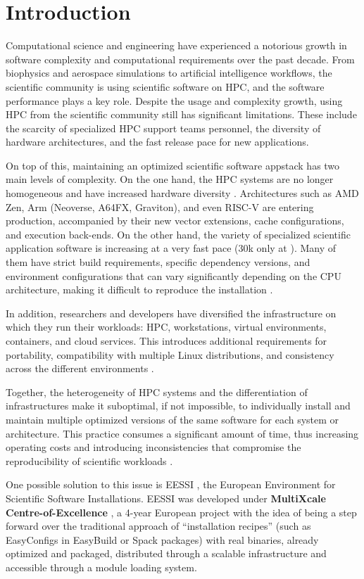 \documentclass[11pt,a4paper]{article}
\begin{document}
\section{Introduction}
Computational science and engineering have experienced a notorious growth in software complexity and computational requirements over the past decade. From biophysics and aerospace simulations to artificial intelligence workflows, the scientific community is using scientific software on HPC, and the software performance plays a key role.
Despite the usage and complexity growth, using HPC from the scientific community still has significant limitations. These include the scarcity of specialized HPC support teams personnel, the diversity of hardware architectures, and the fast release pace for new applications. 

On top of this, maintaining an optimized scientific software appstack has two  main levels of complexity. On the one hand, the HPC systems are no longer homogeneous and have increased hardware diversity \citep{Strohmaier}. Architectures such as AMD Zen, Arm (Neoverse, A64FX, Graviton), and even RISC-V are entering production, accompanied by their new vector extensions, cache configurations, and execution back-ends. 
On the other hand, the variety of specialized scientific application software is increasing at a very fast pace (30k only at \cite{Ison2019}). Many of them have strict build requirements, specific dependency versions, and environment configurations that can vary significantly depending on the CPU architecture, making it difficult to reproduce the installation \citep{Taschuk2017}.

In addition, researchers and developers have diversified the infrastructure on which they run their workloads: HPC, workstations, virtual environments, containers, and cloud services. This introduces additional requirements for portability, compatibility with multiple Linux distributions, and consistency across the different environments \citep{Droge2023,OCais2025,Bhattacharya2022}. 

Together, the heterogeneity of HPC systems and the differentiation of infrastructures make it suboptimal, if not impossible, to individually install and maintain multiple optimized versions of the same software for each system or architecture.  This practice consumes a significant amount of time, thus increasing operating costs and introducing inconsistencies that compromise the reproducibility of scientific workloads \citep{Taschuk2017}.

One possible solution to this issue is EESSI \citep{Droge2023}, the European Environment for Scientific Software Installations. EESSI was developed under \textbf{MultiXcale Centre-of-Excellence} \citep{mxs}, a 4-year European project with the idea of being a step forward over the traditional approach of “installation recipes” (such as EasyConfigs in EasyBuild \citep{Hoste2012} or Spack \citep{Gamblin2015} packages) with real binaries, already optimized and packaged, distributed through a scalable infrastructure and accessible through a module loading system.
\end{document}
